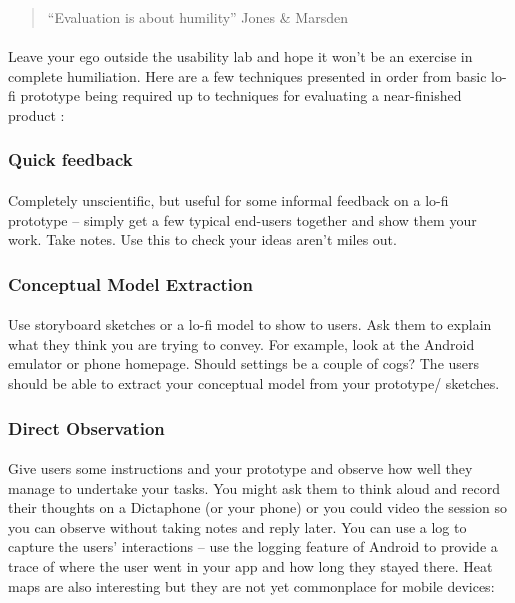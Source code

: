 \begin{quote}
``Evaluation is about humility'' Jones \& Marsden
\end{quote}

\paragraph{} Leave your ego outside the usability lab and hope it won't be an exercise in complete humiliation. Here are a few techniques presented in order from basic lo-fi prototype being required up to techniques for evaluating a near-finished product :

\subsubsection{Quick feedback}
\paragraph{} Completely unscientific, but useful for some informal feedback on a lo-fi prototype – simply get a few typical end-users together and show them your work. Take notes. Use this to check your ideas aren’t miles out.

\subsubsection{Conceptual Model Extraction}
\paragraph{} Use storyboard sketches or a lo-fi model to show to users. Ask them to explain what they think you are trying to convey. For example, look at the Android emulator or phone homepage. Should settings be a couple of cogs? The users should be able to extract your conceptual model from your prototype/ sketches.

\subsubsection{Direct Observation}
\paragraph{} Give users some instructions and your prototype and observe how well they manage to undertake your tasks. You might ask them to think aloud and record their thoughts on a Dictaphone (or your phone) or you could video the session so you can observe without taking notes and reply later. You can use a log to capture the users' interactions – use the logging feature of Android to provide a trace of where the user went in your app and how long they stayed there. Heat maps are also interesting but they are not yet commonplace for mobile devices:


